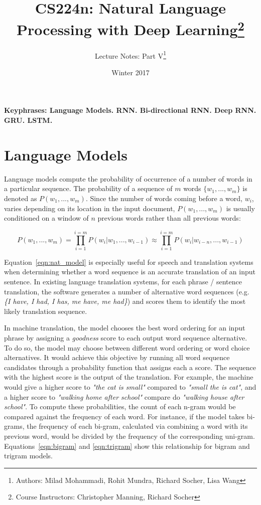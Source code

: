 \documentclass{tufte-handout}
\title{CS224n: Natural Language Processing with Deep Learning\thanks{Course Instructors: Christopher Manning, Richard Socher}}
\author[Milad Mohammadi, Rohit Mundra, Lisa Wang, Richard Socher]{Lecture Notes: Part V\thanks{Authors: Milad Mohammadi, Rohit Mundra, Richard Socher, Lisa Wang}}
\date{Winter 2017} %
\begin{document}
\maketitle%

\textbf{Keyphrases: Language Models. RNN. Bi-directional RNN. Deep RNN. GRU. LSTM.}

\section{Language Models}
Language models compute the probability of occurrence of a number of words in a particular sequence. The probability of a sequence of $m$ words $\{w_1, ..., w_m \}$ is denoted as $P(w_1,...,w_m)$. Since the number of words coming before a word, $w_i$, varies depending on its location in the input document, $P(w_1,...,w_m)$ is usually conditioned on a window of $n$ previous words rather than all previous words:

\begin{equation}
	P(w_1,...,w_m) = \prod_{i=1}^{i=m} P(w_{i} | w_1, ..., w_{i-1}) \approx \prod_{i=1}^{i=m} P(w_{i} | w_{i-n}, ..., w_{i-1})
	\label{eqn:nat_model}
\end{equation}

Equation~\ref{eqn:nat_model} is especially useful for speech and translation systems when determining whether a word sequence is an accurate translation of an input sentence. In existing language translation systems, for each phrase / sentence translation, the software generates a number of alternative word sequences (e.g. \textit{\{I have, I had, I has, me have, me had\}}) and scores them to identify the most likely translation sequence. 

In machine translation, the model chooses the best word ordering for an input phrase by assigning a \textit{goodness} score to each output word sequence alternative. To do so, the model may choose between different word ordering or word choice alternatives. It would achieve this objective by running all word sequence candidates through a probability function that assigns each a score. The sequence with the highest score is the output of the translation. For example, the machine would give a higher score to \textit{"the cat is small"} compared to \textit{"small the is cat"}, and a higher score to \textit{"walking home after school"} compare do \textit{"walking house after school"}. To compute these probabilities, the count of each n-gram would be compared against the frequency of each word. For instance, if the model takes bi-grams, the frequency of each bi-gram, calculated via combining a word with its previous word, would be divided by the frequency of the corresponding uni-gram. Equations~\ref{eqn:bigram} and \ref{eqn:trigram} show this relationship for bigram and trigram models.
\end{document}
